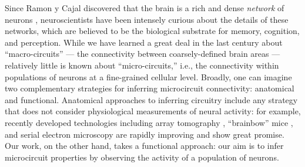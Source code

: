 Since Ramon y Cajal discovered that the brain is a rich and dense \emph{network} of neurons \cite{RamonyCajal04,RamonyCajal23}, neuroscientists have been intensely curious about the details of these networks, which are believed to be the biological substrate for memory, cognition, and perception. While we have learned a great deal in the last century about ``macro-circuits'' --- the connectivity between coarsely-defined brain areas --- relatively little is known about ``micro-circuits,'' i.e., the connectivity within populations of neurons at a fine-grained cellular level. Broadly, one can imagine two complementary strategies for inferring microcircuit connectivity: anatomical and functional. Anatomical approaches to inferring circuitry include any strategy that does not consider physiological measurements of neural activity: for example, recently developed technologies including array tomography \cite{MichevaSmith07}, ``brainbow'' mice \cite{Brainbow07}, and serial electron microscopy \cite{Briggman2006} are rapidly improving and show great promise. Our work, on the other hand, takes a functional approach: our aim is to infer microcircuit properties by observing the activity of a population of neurons.


